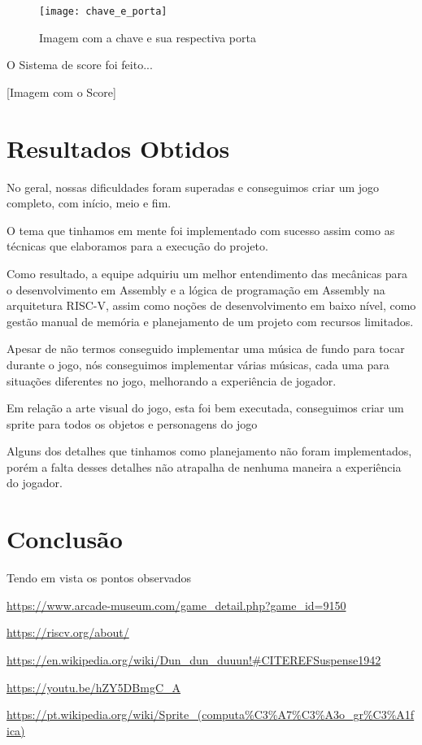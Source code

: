 \documentclass[conference]{IEEEtran}
\begin{document}
\begin{figure}[H]
\centering
\texttt{[image: chave\_e\_porta]}
\caption{Imagem com a chave e sua respectiva porta}
\end{figure}

O Sistema de score foi feito... 

[Imagem com o Score]

\section{Resultados Obtidos}
No geral, nossas dificuldades foram superadas e conseguimos criar um jogo completo, com início, meio e fim. 

O tema que tinhamos em mente foi implementado com sucesso assim como as técnicas que elaboramos para a execução do projeto. 

Como resultado, a equipe adquiriu um melhor entendimento das mecânicas para o desenvolvimento em Assembly e a lógica de programação em Assembly na arquitetura RISC-V, assim como noções de desenvolvimento em baixo nível, como gestão manual de memória e planejamento de um projeto com recursos limitados.

Apesar de não termos conseguido implementar uma música de fundo para tocar durante o jogo, nós conseguimos implementar várias músicas, cada uma para situações diferentes no jogo, melhorando a experiência de jogador.

Em relação a arte visual do jogo, esta foi bem executada, conseguimos criar um sprite\textsuperscript{\cite{b5}} para todos os objetos e personagens do jogo 

Alguns dos detalhes que tinhamos como planejamento não foram implementados, porém a falta desses detalhes não atrapalha de nenhuma maneira a experiência do jogador.

\section*{Conclusão}

Tendo em vista os pontos observados

\begin{thebibliography}{00}
 \url{https://www.arcade-museum.com/game_detail.php?game_id=9150} 

 \url{https://riscv.org/about/}

 \url{https://en.wikipedia.org/wiki/Dun_dun_duuun!\#CITEREFSuspense1942}

 \url{https://youtu.be/hZY5DBmgC_A}

 \url{https://pt.wikipedia.org/wiki/Sprite_(computa%C3%A7%C3%A3o_gr%C3%A1fica)}

\end{thebibliography}
\vspace{12pt}
\end{document}

